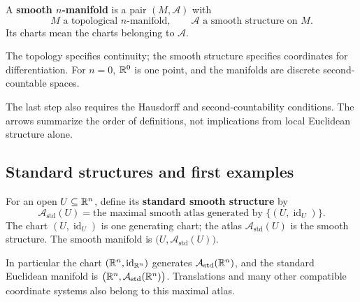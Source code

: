 \begin{definition}
A \textbf{smooth $n$-manifold} is a pair $(M,\mathcal A)$ with
\[
\boxed{M\text{ a topological }n\text{-manifold},\qquad
\mathcal A\text{ a smooth structure on }M.}
\]
Its charts mean the charts belonging to $\mathcal A$.
\end{definition}
The topology specifies continuity; the smooth structure specifies coordinates
for differentiation. For $n=0$, $\mathbb{R}^0$ is one point, and the manifolds are
discrete second-countable spaces.

\begin{center}
\end{center}
The last step also requires the Hausdorff and second-countability conditions.
The arrows summarize the order of definitions, not implications from local
Euclidean structure alone.

\subsection{Standard structures and first examples}
\begin{definition}
For an open $U\subseteq\mathbb{R}^n$, define its \textbf{standard smooth structure} by
\[
\mathcal A_{\mathrm{std}}(U)
=\text{the maximal smooth atlas generated by }\{(U,\operatorname{id}_U)\}.
\]
The chart $(U,\operatorname{id}_U)$ is one generating chart; the atlas
$\mathcal A_{\mathrm{std}}(U)$ is the smooth structure. The smooth manifold is
$\bigl(U,\mathcal A_{\mathrm{std}}(U)\bigr)$.
\end{definition}
In particular the chart $(\mathbb{R}^n,\operatorname{id}_{\mathbb{R}^n})$ generates
$\mathcal A_{\mathrm{std}}(\mathbb{R}^n)$, and the standard Euclidean manifold is
$\bigl(\mathbb{R}^n,\mathcal A_{\mathrm{std}}(\mathbb{R}^n)\bigr)$.
Translations and many other compatible coordinate systems also belong to
this maximal atlas.

